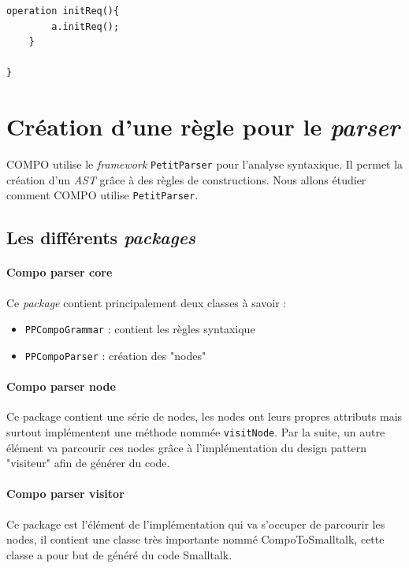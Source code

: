 \documentclass[11pt,a4paper,openany,oneside]{book}
\begin{document}
\begin{appendices}
\begin{lstlisting}[language=Compo, frame=single, caption=Programme]
	operation initReq(){
	    a.initReq();
	}
	
}
\end{lstlisting}





\chapter{Création d'une règle pour le \textit{parser}}

COMPO utilise le \textit{framework} \texttt{PetitParser} pour l'analyse syntaxique. Il permet la création d'un \textit{AST} grâce à des règles de constructions. Nous allons étudier comment COMPO utilise \texttt{PetitParser}.

\section*{Les différents \textit{packages}}

\subsubsection{Compo parser core}
Ce \textit{package} contient principalement deux classes à savoir :

\begin{itemize}
\item \texttt{PPCompoGrammar} : contient les règles syntaxique
\item \texttt{PPCompoParser} : création des "nodes"
\end{itemize}
	
\subsubsection{Compo parser node}
Ce package contient une série de nodes, les nodes ont leurs propres attributs mais surtout implémentent une méthode nommée \texttt{visitNode}.
Par la suite, un autre élément va parcourir ces nodes grâce à l'implémentation du design pattern "visiteur" afin de générer du code.

\subsubsection{Compo parser visitor}
Ce package est l'élément de l'implémentation qui va s'occuper de parcourir les nodes, il contient une classe très importante nommé
CompoToSmalltalk, cette classe a pour but de généré du code Smalltalk.


\end{appendices}
\end{document}
